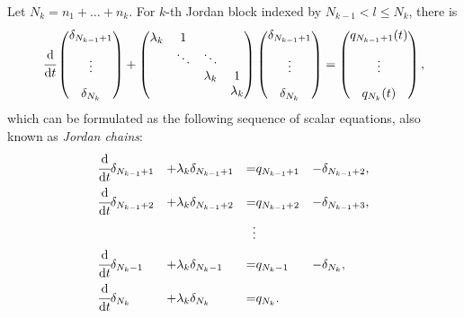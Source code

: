 Let $N_k = n_1+\dots + n_k$. For $k$-th Jordan block indexed by $N_{k-1} < l \leq N_k$, there is
\begin{equation}
    \cfrac{\mathrm{d} }{\mathrm{d} t}
    \begin{pmatrix}
        \delta_{N_{k-1} + 1} \\[0.8em] \vdots \\[0.8em] \delta_{N_k}
    \end{pmatrix} 
    + 
    \begin{pmatrix}
        \lambda_k & 1 \\
        & \ddots & \ddots \\
        & & \lambda_k & 1\\
        & & & \lambda_k \\
    \end{pmatrix}
    \begin{pmatrix}
        \delta_{N_{k-1} + 1} \\[0.8em] \vdots \\[0.8em] \delta_{N_k}
    \end{pmatrix} 
    =
    \begin{pmatrix}
        q_{N_{k-1} + 1}(t) \\[0.8em] \vdots \\[0.8em] q_{N_k}(t)
    \end{pmatrix},
\end{equation}
which can be formulated as the following sequence of scalar equations, also known as \textit{Jordan chains}:
\begin{alignat}{4}
    &\cfrac{\mathrm{d} }{\mathrm{d} t}\delta_{N_{k-1} + 1} &+&\lambda_k\delta_{N_{k-1} + 1} &=& q_{N_{k-1}+1} &-& \delta_{N_{k-1}+2}, \label{eq:jordan-chain-first}\\
    &\cfrac{\mathrm{d} }{\mathrm{d} t}\delta_{N_{k-1} + 2} &+&\lambda_k\delta_{N_{k-1} + 2} &=& q_{N_{k-1}+2} &-& \delta_{N_{k-1}+3}, \label{eq:jordan-chain-second}\\
    &&&& \vdots \nonumber\\
    &\cfrac{\mathrm{d} }{\mathrm{d} t}\delta_{N_k-1} &+&\lambda_k\delta_{N_k-1} &=& q_{N_k-1} &-& \delta_{N_k}, \label{eq:jordan-chain-second2last}\\
    &\cfrac{\mathrm{d} }{\mathrm{d} t}\delta_{N_k} &+& \lambda_k\delta_{N_k} &=& q_{N_k}. \label{eq:jordan-chain-last}
\end{alignat}


